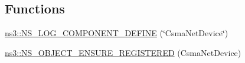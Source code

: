 \subsection*{Functions}
\begin{DoxyCompactItemize}
\item 
\hyperlink{namespacens3_ad3a75892de1091713b675591926d4d3f}{ns3\+::\+N\+S\+\_\+\+L\+O\+G\+\_\+\+C\+O\+M\+P\+O\+N\+E\+N\+T\+\_\+\+D\+E\+F\+I\+NE} (\char`\"{}Csma\+Net\+Device\char`\"{})
\item 
\hyperlink{namespacens3_a0cd67124fd9d8d7461672aad13d82f3d}{ns3\+::\+N\+S\+\_\+\+O\+B\+J\+E\+C\+T\+\_\+\+E\+N\+S\+U\+R\+E\+\_\+\+R\+E\+G\+I\+S\+T\+E\+R\+ED} (Csma\+Net\+Device)
\end{DoxyCompactItemize}
